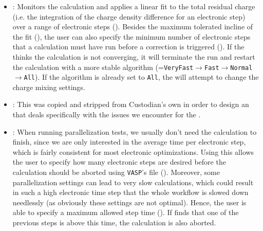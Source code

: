 \begin{refsection}
\begin{itemize} 
 
\item {}: Monitors the calculation and 
applies a linear fit to the total residual charge (i.e. the integration of the 
charge density difference for an electronic step) over a range of electronic 
steps (). Besides the maximum tolerated incline of the 
fit (), the user can also specify the minimum 
number of electronic steps that a calculation must have run before a 
correction is triggered (). If the 
 thinks the calculation is not converging, it will 
terminate the run and restart the calculation with a more stable algorithm 
(=\texttt{VeryFast}$\rightarrow$\texttt{Fast}$\rightarrow$\texttt{Normal}$\rightarrow$\texttt{All}). 
If the algorithm is already set to \texttt{All}, the 
 will attempt to change the charge mixing 
settings. 
 
 
\item {}: This  was copied and 
stripped from Custodian's own  in order to design an 
 that deals specifically with the issues we encounter for 
the . 
 
\item {}: When running parallelization tests, 
we usually don't need the calculation to finish, since we are only interested 
in the average time per electronic step, which is fairly consistent for most 
electronic optimizations. Using this  allows the user to 
specify how many electronic steps are desired before the calculation should be 
aborted using \texttt{VASP}'s  file (). 
Moreover, some parallelization settings can lead to very slow calculations, 
which could result in such a high electronic time step that the whole workflow 
is slowed down needlessly (as obviously these settings are not optimal). 
Hence, the user is able to specify a maximum allowed step time 
(). If  finds 
that one of the previous steps is above this time, the calculation is also 
aborted. 
 

\end{itemize}
\end{refsection}
